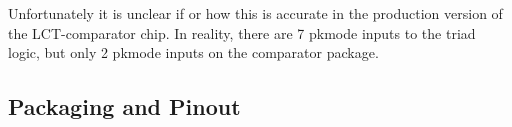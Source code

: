 \documentclass[letterpaper]{article}
\begin{document}
Unfortunately it is unclear if or how this is accurate in the production version of the LCT-comparator chip. In reality, there are 7 pkmode inputs to the triad logic, but only 2 pkmode inputs on the comparator package.

\subsection{Packaging and Pinout}


\footnotesize
\begin{center}
\renewcommand{\arraystretch}{1.0}
\begin{tabular}{ | c | c | c | l | }

%
%
%



\end{tabular}
\end{center}
\end{document}
